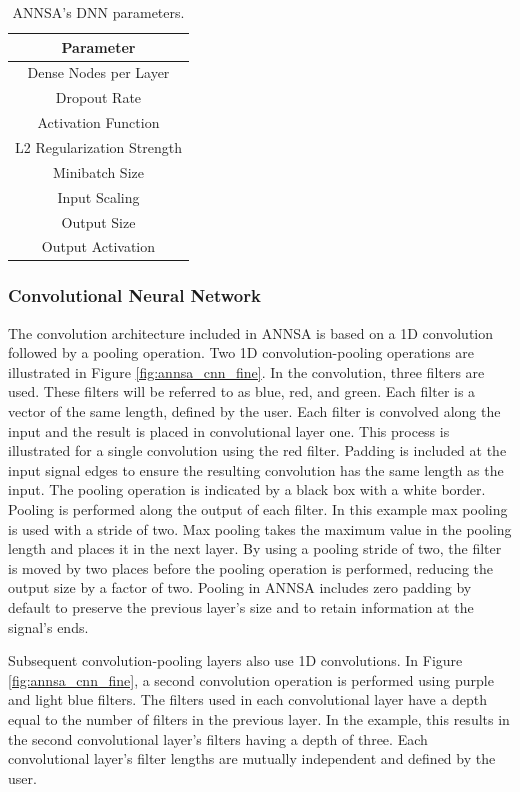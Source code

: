 \begin{table}[H]
\centering
\caption{ANNSA's DNN parameters.}
\begin{tabular}{c}
\hline
Parameter \\ \hline
Dense Nodes per Layer \\
Dropout Rate \\
Activation Function \\
L2 Regularization Strength \\ 
Minibatch Size \\ 
Input Scaling \\
Output Size \\
Output Activation \\ \hline
\end{tabular}
\label{table:annsa_dnn_params}
\end{table}

\subsubsection{Convolutional Neural Network} \label{annsa_section_conv_neural_network}

The convolution architecture included in ANNSA is based on a 1D convolution followed by a pooling operation. Two 1D convolution-pooling operations are illustrated in Figure \ref{fig:annsa_cnn_fine}. In the convolution, three filters are used. These filters will be referred to as blue, red, and green. Each filter is a vector of the same length, defined by the user. Each filter is convolved along the input and the result is placed in convolutional layer one. This process is illustrated for a single convolution using the red filter. Padding is included at the input signal edges to ensure the resulting convolution has the same length as the input. The pooling operation is indicated by a black box with a white border. Pooling is performed along the output of each filter. In this example max pooling is used with a stride of two. Max pooling takes the maximum value in the pooling length and places it in the next layer. By using a pooling stride of two, the filter is moved by two places before the pooling operation is performed, reducing the output size by a factor of two. Pooling in ANNSA includes zero padding by default to preserve the previous layer's size and to retain information at the signal's ends.

Subsequent convolution-pooling layers also use 1D convolutions. In Figure \ref{fig:annsa_cnn_fine}, a second convolution operation is performed using purple and light blue filters. The filters used in each convolutional layer have a depth equal to the number of filters in the previous layer. In the example, this results in the second convolutional layer's filters having a depth of three. Each convolutional layer's filter lengths are mutually independent and defined by the user.

